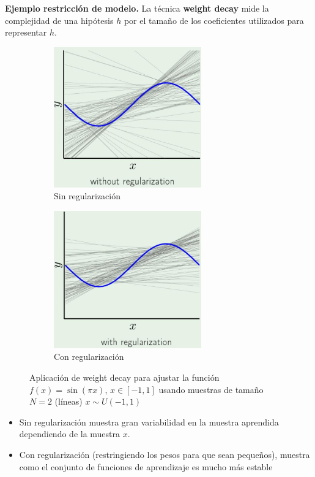 \documentclass[11pt,a4paper]{article}
\theoremstyle{definition}
\begin{document}
	\textbf{Ejemplo restricción de modelo.}
	La técnica \textbf{weight decay} mide la complejidad de una hipótesis $h$ por el tamaño de los coeficientes utilizados para representar $h$.
	\begin{figure}[H]
		\centering
		\begin{subfigure}{.5\textwidth}
  		\centering
  		\includegraphics[width=0.7\textwidth]{images/wd_without_reg}
  		\caption{Sin regularización}
  		\label{fig:sub1}
		\end{subfigure}%
		\begin{subfigure}{.5\textwidth}
  		\centering
  		\includegraphics[width=0.7\textwidth]{images/wd_with_reg}
  		\caption{Con regularización}
  		\label{fig:sub2}
		\end{subfigure}
		\caption{Aplicación de weight decay para ajustar la función $f(x)=\sin(\pi x)$, $x\in [-1,1]$ usando muestras de tamaño $N=2$ (líneas) $x\sim U(-1,1)$}
		\label{fig:test}
	\end{figure}
	\begin{itemize}
	\item Sin regularización muestra gran variabilidad en la muestra aprendida dependiendo de la muestra $x$.
	\item Con regularización (restringiendo los pesos para que sean pequeños), muestra como el conjunto de funciones de aprendizaje es mucho más estable
	\end{itemize}
	
\end{document}
